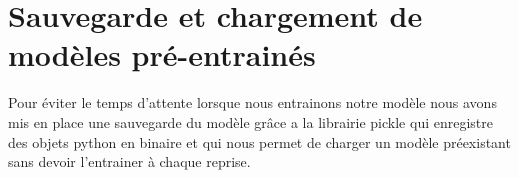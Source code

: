 \section{Sauvegarde et chargement de modèles pré-entrainés} \label{model}

Pour éviter le temps d'attente lorsque nous entrainons notre modèle nous avons mis en place une sauvegarde du modèle grâce a la librairie pickle qui enregistre des objets python en binaire et qui nous permet de charger un modèle préexistant sans devoir l’entrainer à chaque reprise.
